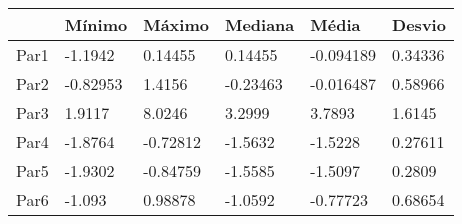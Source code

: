 \begin{tabular}{llllll}
& Mínimo & Máximo & Mediana & Média & Desvio \\ 
\hline 
Par1 & -1.1942 & 0.14455 & 0.14455 & -0.094189 & 0.34336 \\ 
Par2 & -0.82953 & 1.4156 & -0.23463 & -0.016487 & 0.58966 \\ 
Par3 & 1.9117 & 8.0246 & 3.2999 & 3.7893 & 1.6145 \\ 
Par4 & -1.8764 & -0.72812 & -1.5632 & -1.5228 & 0.27611 \\ 
Par5 & -1.9302 & -0.84759 & -1.5585 & -1.5097 & 0.2809 \\ 
Par6 & -1.093 & 0.98878 & -1.0592 & -0.77723 & 0.68654 \\ 
\hline 
\end{tabular}